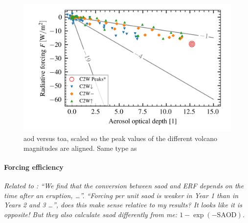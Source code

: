 \documentclass[twocol]{ametsocV5}
\begin{document}
\begin{figure}
  \begin{center}
    \includegraphics[width=0.95\linewidth]{figures/aod_vs_toa_avg_scaled.png}
  \end{center}
  \caption{
    \acrshort{aod} versus \acrshort{toa}, scaled so the peak values of the different
    volcano magnitudes are aligned. Same type as \citet{gregory2016}
  }%
  \label{fig:aod_vs_toa_scaled}
\end{figure}

\paragraph{Forcing efficiency}

\emph{Related to \citet{marshall2020}: ``We find that the conversion between
  \acrshort{saod} and ERF depends on the time after an eruption, \dots''. ``Forcing per
  unit \acrshort{saod} is weaker in Year 1 than in Years 2 and 3 \dots'', does this make
  sense relative to my results? It looks like it is opposite! But they also calculate
  \acrshort{saod} differently from me: \( 1-\exp(-\mathrm{SAOD}) \).}
\end{document}
